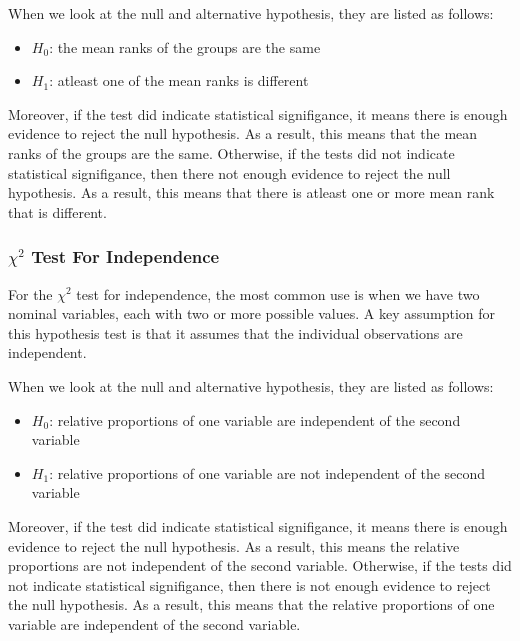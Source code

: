 \documentclass[a4paper, twocolumn]{article}
\begin{document}
When we look at the null and alternative hypothesis, they are listed as follows:

\begin{itemize}
    \item $H_0$: the mean ranks of the groups are the same
    \item $H_1$: atleast one of the mean ranks is different
\end{itemize}

Moreover, if the test did indicate statistical signifigance, it means there is enough evidence to reject the null 
hypothesis. As a result, this means that the mean ranks of the groups are the same. Otherwise, if the tests did not 
indicate statistical signifigance, then there not enough evidence to reject the null hypothesis. As a result, this
means that there is atleast one or more mean rank that is different.

\subsubsection{ $\chi^2$ Test For Independence}
For the $\chi^2$ test for independence, the most common use is when we have two nominal variables, each with two or
more possible values. A key assumption for this hypothesis test is that it assumes that the individual observations 
are independent.

When we look at the null and alternative hypothesis, they are listed as follows:

\begin{itemize}
    \item $H_0$: relative proportions of one variable are independent of the second variable
    \item $H_1$: relative proportions of one variable are not independent of the second variable
\end{itemize}

Moreover, if the test did indicate statistical signifigance, it means there is enough evidence to reject the null 
hypothesis. As a result, this means the relative proportions are not independent of the second variable. Otherwise,
if the tests did not indicate statistical signifigance, then there is not enough evidence to reject the null
hypothesis. As a result, this means that the relative proportions of one variable are independent of the second
variable.
\end{document}
